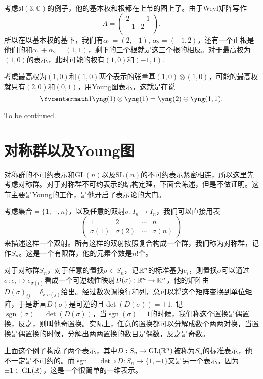 \documentclass[9pt]{extarticle}
\newcommand{\cc}{\mathbb{C}}
\DeclareMathOperator{\sgn}{sgn}
\begin{document}
\para 考虑$\mathfrak{sl}(3,\cc)$的例子，他的基本权和根都在上节的图上了。由于Weyl矩阵写作
\[
	A=\begin{pmatrix}
	2&-1\\
	-1&2\\
	\end{pmatrix}.
\]
所以在以基本权的基下，我们有$\alpha_1=(2,-1)$, $\alpha_2=(-1,2)$，还有一个正根是他们的和$\alpha_1+\alpha_2=(1,1)$，剩下的三个根就是这三个根的相反。对于最高权为$(1,0)$的表示，此时可能的权有$(1,0)$和$(-1,1)$. 

考虑最高权为$(1,0)$和$(1,0)$两个表示的张量基$(1,0)\otimes (1,0)$，可能的最高权就只有$(2,0)$和$(0,1)$，用Young图表示，这就是在说
\[
\Yvcentermath1
\yng(1)\otimes \yng(1)=\yng(2)\oplus\yng(1,1).
\]

To be continued.

\section{对称群以及Young图}

对称群的不可约表示和$\mathrm{GL}(n)$以及$\mathrm{SL}(n)$的不可约表示紧密相连，所以这里先考虑对称群。对于对称群不可约表示的结构定理，下面会陈述，但是不做证明。这节主要是Young的工作，是他开启了表示论的大门。

\para 考虑集合$=\{1,\cdots,n\}$，以及任意的双射$\sigma : I_n\to I_n$，我们可以直接用表
\[
	\begin{pmatrix}
	1&2&\cdots &n\\
	\sigma(1)&\sigma(2)&\cdots &\sigma(n)
	\end{pmatrix}
\]
来描述这样一个双射。所有这样的双射按照复合构成一个群，我们称为对称群，记作$S_n$。这是一个有限群，他的元素个数是$n!$个。

\para 对于对称群$S_n$，对于任意的置换$\sigma\in S_n$，记$\mathbb{R}^n$的标准基为$e_i$，则置换$\sigma$可以通过$\sigma:e_i\mapsto e_{\sigma(i)}$看成一个可逆线性映射$D(\sigma): \mathbb{R}^n\to \mathbb{R}^n$，他的矩阵由$D(\sigma)_{ij}=\delta_{i,\sigma(j)}$给出。经过数次调换行和列，总可以将这个矩阵变换到单位矩阵，于是断言$D(\sigma)$是可逆的且$\det(D(\sigma))=\pm 1$. 记$\sgn(\sigma)=\det(D(\sigma))$，当$\sgn(\sigma)=1$的时候，我们称这个置换是偶置换，反之，则叫他奇置换。实际上，任意的置换都可以分解成数个两两对换，当置换是偶置换的时候，分解出两两置换的数目是偶数，反之是奇数。

上面这个例子构成了两个表示，其中$D:S_n\to \mathrm{GL}(\mathbb{R}^n)$被称为$S_n$的标准表示，他不一定是不可约的。而$\sgn=\det\circ D:S_n\to \{1,-1\}$又是另一个表示，因为$\pm 1\in \mathrm{GL}(\mathbb{R})$，这是一个很简单的一维表示。
\end{document}
